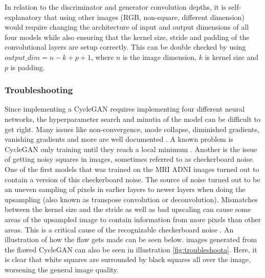 \documentclass[11pt, fleqn, titlepage]{article}
\newcommand{\1}[1]{\mathds{1}\left[#1\right]}
\begin{document}
In relation to the discriminator and generator convolution depths, it is self-explanatory that using other images (RGB, non-square, different dimension) would require changing the architecture of input and output dimensions of all four models while also ensuring that the kernel size, stride and padding of the convolutional layers are setup correctly. This can be double checked by using $output\_dim = n - k + p + 1$, where $n$ is the image dimension, $k$ is kernel size and $p$ is padding.


\subsubsection{Troubleshooting}\label{troubleshooting}
Since implementing a CycleGAN requires implementing four different neural networks, the hyperparameter search and minutia of the model can be difficult to get right. Many issues like non-convergence, mode collapse, diminished gradients, vanishing gradients and more are well documented \cite{hard_to_train}. A known problem is CycleGAN only training until they reach a local minimum \cite{ganlocalminimum}. Another is the issue of getting noisy squares in images, sometimes referred to as checkerboard noise. One of the first models that was trained on the MRI ADNI images turned out to contain a version of this checkerboard noise. The source of noise turned out to be an uneven sampling of pixels in earlier layers to newer layers when doing the upsampling (also known as transpose convolution or deconvolution). Mismatches between the kernel size and the stride as well as bad upscaling can cause some areas of the upsampled image to contain information from more pixels than other areas. This is a critical cause of the recognizable checkerboard noise \cite{checkerboard}. An illustration of how the flaw gets made can be seen below. images generated from the flawed CycleGAN can also be seen in illustration \ref{fig:troubleshoota}. Here, it is clear that white squares are surrounded by black squares all over the image, worsening the general image quality.
\end{document}
